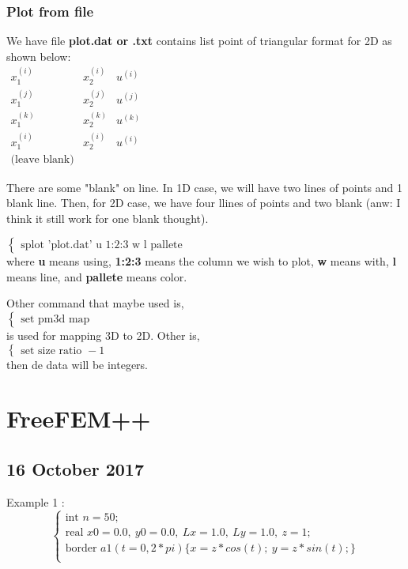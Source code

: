 \documentclass[a4paper,10pt]{article}
\begin{document}
\subsubsection{Plot from file}
We have file \textbf{plot.dat or .txt} contains list point of triangular format for 2D as shown below:\\
$ \begin{matrix}
	x^{(i)}_{1} & x^{(i)}_{2} & u^{(i)} \\
	x^{(j)}_{1} & x^{(j)}_{2} & u^{(j)} \\
	x^{(k)}_{1} & x^{(k)}_{2} & u^{(k)} \\
	x^{(i)}_{1} & x^{(i)}_{2} & u^{(i)} \\
	\text{(leave blank)}
\end{matrix} $

There are some "blank" on line. In 1D case, we will have two lines of points and 1 blank line. Then, for 2D case, we have four llines of points and two blank (anw: I think it still work for one blank thought).

$ \begin{cases}
\text{splot 'plot.dat' u 1:2:3 w l pallete}
\end{cases} $ \\
where \textbf{u} means using, \textbf{1:2:3} means the column we wish to plot, \textbf{w} means with, \textbf{l} means line, and \textbf{pallete} means color.

Other command that maybe used is,\\
$ \begin{cases}
\text{set pm3d map}
\end{cases} $\\
is used for mapping 3D to 2D. Other is,\\
$ \begin{cases}
\text{set size ratio } -1
\end{cases} $\\
then de data will be integers.


\section{FreeFEM++}

\subsection{16 October 2017}
Example 1 :
\begin{equation}\nonumber
\begin{cases}
\text{int } n=50;\\
\text{real } x0=0.0 ,\ y0=0.0 ,\ Lx=1.0 ,\ Ly=1.0 ,\ z=1; \\
\text{border } a1(t=0, 2*pi) \{x=z*cos(t); \ y=z*sin(t); \}\\
\end{cases}
\end{equation}
\end{document}
